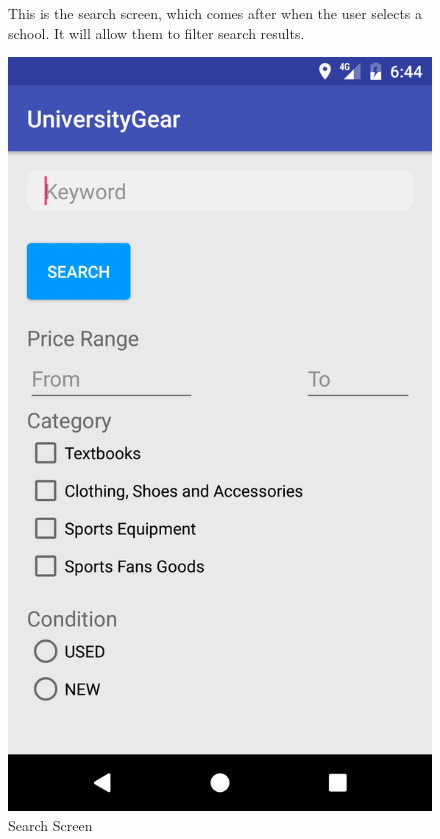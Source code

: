 \documentclass[journal,compsoc, 10pt, draftclsnofoot, onecolumn]{IEEEtran}
\begin{document}
\begin{figure}[!h]
This is the search screen, which comes after when the user selects a school. It 
will allow them to filter search results.
\centering
\caption{Search Screen}
\includegraphics[scale=.15]{searchScreen}
\end{figure}
\FloatBarrier
\end{document}
